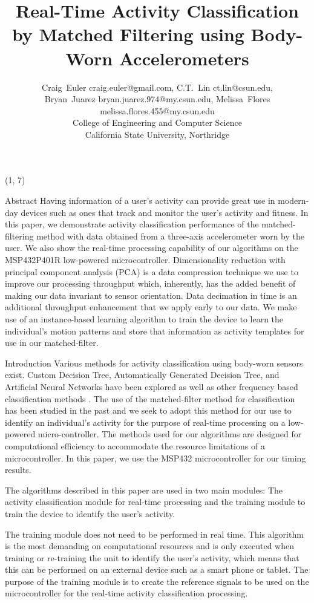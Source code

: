 \documentclass[unknownkeysallowed,final]{beamer}
\title{\normalsize{Real-Time Activity Classification by Matched Filtering using Body-Worn Accelerometers}}
\author{\small{Craig~Euler craig.euler@gmail.com, C.T.~Lin ct.lin@csun.edu,\\Bryan~Juarez bryan.juarez.974@my.csun.edu, Melissa~Flores melissa.flores.455@my.csun.edu\\College of Engineering and Computer Science\\California State University, Northridge}}
\date{}
\begin{document}
\tiny{}
\begin{frame}{} 

\begin{textblock}{19.5}(1, 7)

\begin{block}{\small{Abstract}}
Having information of a user's activity can provide great use in modern-day devices such as ones that track and monitor the user's activity and fitness.
In this paper, we demonstrate activity classification performance of the matched-filtering method with data obtained from a three-axis accelerometer worn by the user.
We also show the real-time processing capability of our algorithms on the MSP432P401R low-powered microcontroller.
Dimensionality reduction with principal component analysis (PCA) \cite{bishop_2006} is a data compression technique we use to improve our processing throughput which, inherently, has the added benefit of making     our data invariant to sensor orientation.
Data decimation in time is an additional throughput enhancement that we apply early to our data.
We make use of an instance-based learning algorithm to train the device to learn the individual's motion patterns and store that information as activity templates for use in our matched-filter.
\end{block}

\begin{block}{\small{Introduction}}
Various methods for activity classification using body-worn sensors exist.
Custom Decision Tree, Automatically Generated Decision Tree, and Artificial Neural Networks \cite{parkka_ermes_korpipaa_mantyjarvi_peltola_korhonen_2006} have been explored as well as other frequency based classification methods \cite{sharma_purwar_lee_lee_chung_2008}.
The use of the matched-filter method for classification has been studied in the past \cite{giannakis_tsatsanis_1990} and we seek to adopt this method for our use to identify an individual's activity for the purpose of real-time processing on a low-powered micro-controller.
The methods used for our algorithms are designed for computational efficiency to accommodate the resource limitations of a microcontroller. In this paper, we use the MSP432 microcontroller for our timing results.

The algorithms described in this paper are used in two main modules: The activity classification module for real-time processing and the training module to train the device to identify the user's activity.

The training module does not need to be performed in real time.
This algorithm is the most demanding on computational resources and is only executed when training or re-training the unit to identify the user's activity, which means that this can be performed on an external device such as a smart phone or tablet.
The purpose of the training module is to create the reference signals to be used on the microcontroller for the real-time activity classification processing.


\end{block}
\end{textblock}
\end{frame}
\end{document}
